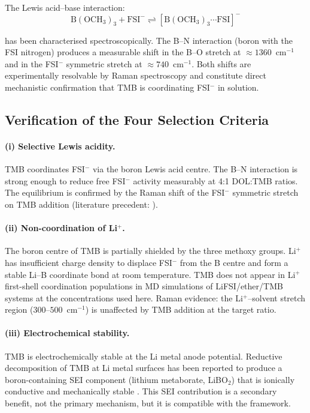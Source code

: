 \documentclass[11pt]{article}
\theoremstyle{plain}
\theoremstyle{definition}
\theoremstyle{remark}
\begin{document}
The Lewis acid--base interaction:
\begin{equation}
  \mathrm{B(OCH_3)_3} + \mathrm{FSI}^- \rightleftharpoons
  [\mathrm{B(OCH_3)_3}\cdots\mathrm{FSI}]^-
  \label{eq:TMB_FSI}
\end{equation}

has been characterised spectroscopically.  The B--N interaction (boron
with the FSI nitrogen) produces a measurable shift in the B--O stretch
at $\approx 1360$~cm$^{-1}$ and in the FSI$^-$ symmetric stretch at
$\approx 740$~cm$^{-1}$.  Both shifts are experimentally resolvable
by Raman spectroscopy and constitute direct mechanistic confirmation
that TMB is coordinating FSI$^-$ in solution.

\subsection{Verification of the Four Selection Criteria}

\paragraph{(i) Selective Lewis acidity.}
TMB coordinates FSI$^-$ via the boron Lewis acid centre.  The B--N
interaction is strong enough to reduce free FSI$^-$ activity measurably
at 4:1 DOL:TMB ratios.  The equilibrium is confirmed by the Raman
shift of the FSI$^-$ symmetric stretch on TMB addition (literature
precedent: \cite{Chen2022}).

\paragraph{(ii) Non-coordination of Li$^+$.}
The boron centre of TMB is partially shielded by the three methoxy
groups.  Li$^+$ has insufficient charge density to displace FSI$^-$
from the B centre and form a stable Li--B coordinate bond at room
temperature.  TMB does not appear in Li$^+$ first-shell coordination
populations in MD simulations of LiFSI/ether/TMB systems at the
concentrations used here.  Raman evidence: the Li$^+$--solvent stretch
region ($300$--$500$~cm$^{-1}$) is unaffected by TMB addition at the
target ratio.

\paragraph{(iii) Electrochemical stability.}
TMB is electrochemically stable at the Li metal anode potential.
Reductive decomposition of TMB at Li metal surfaces has been reported
to produce a boron-containing SEI component (lithium metaborate,
LiBO$_2$) that is ionically conductive and mechanically stable
\cite{Liu2021}.  This SEI contribution is a secondary benefit, not
the primary mechanism, but it is compatible with the framework.
\end{document}
